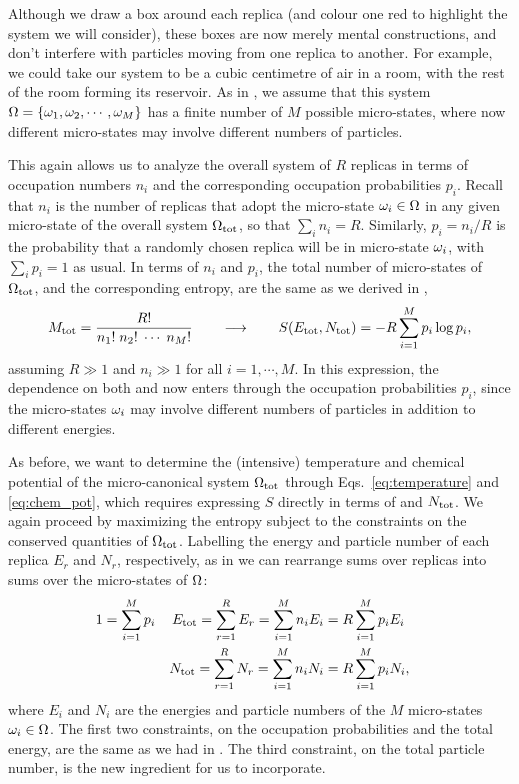 Although we draw a box around each replica (and colour one red to highlight the system \Om we will consider), these boxes are now merely mental constructions, and don't interfere with particles moving from one replica to another.
For example, we could take our system to be a cubic centimetre of air in a room, with the rest of the room forming its reservoir.
As in , we assume that this system $\Omega = \left\{\omega_1, \omega_2, \cdots, \omega_M\right\}$ has a finite number of $M$ possible micro-states, where now different micro-states may involve different numbers of particles.

This again allows us to analyze the overall system of $R$ replicas in terms of occupation numbers $n_i$ and the corresponding occupation probabilities $p_i$.
Recall that $n_i$ is the number of replicas that adopt the micro-state $\omega_i \in \Omega$ in any given micro-state of the overall system $\Omega_{\text{tot}}$, so that $\sum_i n_i = R$.
Similarly, $p_i = n_i / R$ is the probability that a randomly chosen replica will be in micro-state $\omega_i$, with $\sum_i p_i = 1$ as usual.
In terms of $n_i$ and $p_i$, the total number of micro-states of $\Omega_{\text{tot}}$, and the corresponding entropy, are the same as we derived in ,
\begin{equation*}
  M_{\text{tot}} = \frac{R!}{n_1! \; n_2! \; \cdots \; n_M!} \qquad \longrightarrow \qquad S(E_{\text{tot}}, N_{\text{tot}}) = -R \sum_{i = 1}^M p_i \log p_i,
\end{equation*}
assuming $R \gg 1$ and $n_i \gg 1$ for all $i = 1, \cdots, M$.
In this expression, the dependence on both \Etot and \Ntot now enters through the occupation probabilities $p_i$, since the micro-states $\omega_i$ may involve different numbers of particles in addition to different energies.

As before, we want to determine the (intensive) temperature and chemical potential of the micro-canonical system $\Omega_{\text{tot}}$ through Eqs.~\ref{eq:temperature} and \ref{eq:chem_pot}, which requires expressing $S$ directly in terms of \Etot and $N_{\text{tot}}$.
We again proceed by maximizing the entropy subject to the constraints on the conserved quantities of $\Omega_{\text{tot}}$.
Labelling the energy and particle number of each replica $E_r$ and $N_r$, respectively, as in  we can rearrange sums over replicas into sums over the micro-states of $\Omega$:
\begin{align}
  1 & = \sum_{i = 1}^M p_i & E_{\text{tot}} = \sum_{r = 1}^R E_r = \sum_{i = 1}^M n_i E_i & = R \sum_{i = 1}^M p_i E_i \cr
    &                      & N_{\text{tot}} = \sum_{r = 1}^R N_r = \sum_{i = 1}^M n_i N_i & = R \sum_{i = 1}^M p_i N_i, \label{eq:grand_constraint}
\end{align}
where $E_i$ and $N_i$ are the energies and particle numbers of the $M$ micro-states $\omega_i \in \Omega$.
The first two constraints, on the occupation probabilities and the total energy, are the same as we had in .
The third constraint, on the total particle number, is the new ingredient for us to incorporate.

